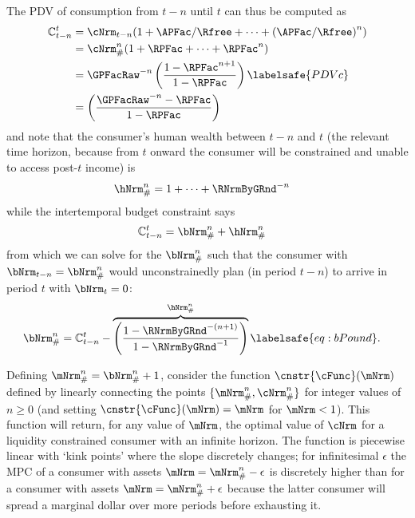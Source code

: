 \documentclass[\econtexRoot/BufferStockTheory]{subfiles}
\begin{document}
The PDV of consumption from $t-n$ until $t$ can thus be computed as
\begin{equation}\begin{gathered}\begin{aligned}
  \mathbb{C}_{t-n}^{t}  & = \cNrm_{t-n}(1+\APFac/\Rfree+ \cdots + {(\APFac/\Rfree)}^{n}) \notag
  \\  & = \cNrm_{\#}^{n}(1+\RPFac+ \cdots + \RPFac^{n}) \notag
  \\  & = \GPFacRaw^{-n}\left(\frac{1-\RPFac^{n+1}}{1-\RPFac}\right) \labelsafe{PDVc}
  \\  & = \left(\frac{\GPFacRaw^{-n}-\RPFac}{1-\RPFac}\right) 
\end{aligned}\end{gathered}\end{equation}
and note that the consumer's human wealth between $t-n$ and $t$ (the relevant
time horizon, because from $t$ onward the consumer will be constrained
and unable to access post-$t$ income) is
\begin{equation}\begin{gathered}\begin{aligned}
  \hNrm_{\#}^{n}  & = 1+ \cdots +\RNrmByGRnd^{-n}
\end{aligned}\end{gathered}\end{equation}
while the intertemporal budget constraint says
\begin{eqnarray*}
  \mathbb{C}_{t-n}^{t}  & = \bNrm_{\#}^{n}+\hNrm_{\#}^{n}
\end{eqnarray*}
from which we can solve for the $\bNrm_{\#}^{n}$ such that
the consumer with $\bNrm_{t-n} = \bNrm_{\#}^{n}$ would
unconstrainedly plan (in period $t-n$) to arrive in period $t$ with
$\bNrm_{t}=0$:
\begin{equation}\begin{gathered}\begin{aligned}
  \bNrm_{\#}^{n} & =  \mathbb{C}_{t-n}^{t} - \overbrace{\left(\frac{1-\RNrmByGRnd^{-(n+1)}}{1-\RNrmByGRnd^{-1}}\right)}^{\hNrm_{\#}^{n}} \labelsafe{eq:bPound}.
\end{aligned}\end{gathered}\end{equation}

Defining $\mNrm_{\#}^{n}=\bNrm_{\#}^{n}+1$, consider the function
$\cnstr{\cFunc}(\mNrm)$ defined by linearly connecting the points
$\{\mNrm_{\#}^{n},\cNrm_{\#}^{n}\}$ for integer values of $n \geq 0$
(and setting $\cnstr{\cFunc}(\mNrm)=\mNrm$ for $\mNrm<1$).
This
function will return, for any value of $\mNrm$, the optimal value of
$\cNrm$ for a liquidity constrained consumer with an infinite horizon.
The function is piecewise linear with `kink points' where the slope
discretely changes; for infinitesimal $\epsilon$ the MPC of a
consumer with assets $\mNrm=\mNrm_{\#}^{n}-\epsilon$ is discretely
higher than for a consumer with assets $\mNrm=\mNrm_{\#}^{n}+\epsilon$
because the latter consumer will spread a marginal dollar over more
periods before exhausting it.
\end{document}
